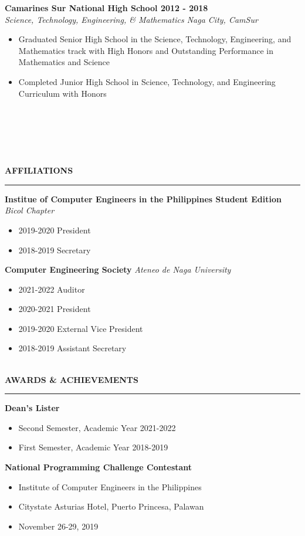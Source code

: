 \documentclass{amsbook}
\begin{document}
\noindent
\textbf{Camarines Sur National High School \hfill 2012 \@- 2018}\\
\textit{Science, Technology, Engineering, \& Mathematics \hfill Naga City, CamSur}
\begin{itemize}
    \item Graduated Senior High School in the Science, Technology, Engineering, and Mathematics track with High Honors and Outstanding Performance in Mathematics and Science
    \item Completed Junior High School in Science, Technology, and Engineering Curriculum with Honors
    
\end{itemize}
\noindent
\\\\\\\\\\
\textbf{AFFILIATIONS}
\\
\rule{\textwidth}{1pt} 
\noindent
\textbf{Institue of Computer Engineers in the Philippines Student Edition}
\textit{Bicol Chapter}
\begin{itemize}
    \item 2019\@-2020 President
    \item 2018\@-2019 Secretary
\end{itemize}
\noindent
\textbf{Computer Engineering Society}
\textit{Ateneo de Naga University}
\begin{itemize}
    \item 2021\@-2022 Auditor
    \item 2020\@-2021 President
    \item 2019\@-2020 External Vice President
    \item 2018\@-2019 Assistant Secretary
\end{itemize}
\noindent
\\
\textbf{AWARDS \& ACHIEVEMENTS}
\\
\rule{\textwidth}{1pt} 
\noindent
\textbf{Dean's Lister}
\begin{itemize}
    \item Second Semester, Academic Year 2021\@-2022
    \item First Semester, Academic Year 2018\@-2019
\end{itemize}
\textbf{National Programming Challenge Contestant}
\begin{itemize}
    \item Institute of Computer Engineers in the Philippines
    \item Citystate Asturias Hotel, Puerto Princesa, Palawan
    \item November 26\@-29, 2019
\end{itemize}
\end{document}
